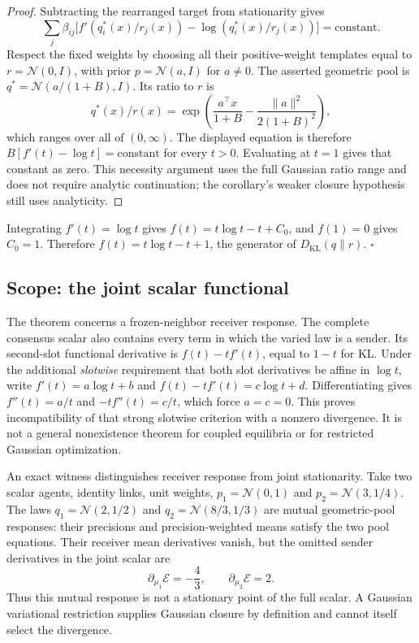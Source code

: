 \begin{proof}
Subtracting the rearranged target from stationarity gives
\begin{equation}
\sum_j\beta_{ij}\big[f'(q_i^*(x)/r_j(x))-\log(q_i^*(x)/r_j(x))\big]=\text{constant}.
\label{eq:summed_stationarity_app}
\end{equation}
Respect the fixed weights by choosing all their positive-weight templates equal to $r=\mathcal N(0,I)$, with prior $p=\mathcal N(a,I)$ for $a\ne0$. The asserted geometric pool is $q^*=\mathcal N(a/(1+B),I)$. Its ratio to $r$ is
\[
q^*(x)/r(x)=\exp\left(\frac{a^\top x}{1+B}-\frac{\|a\|^2}{2(1+B)^2}\right),
\]
which ranges over all of $(0,\infty)$. The displayed equation is therefore $B[f'(t)-\log t]=\text{constant}$ for every $t>0$. Evaluating at $t=1$ gives that constant as zero. This necessity argument uses the full Gaussian ratio range and does not require analytic continuation; the corollary's weaker closure hypothesis still uses analyticity.
\end{proof}

Integrating $f'(t) = \log t$ gives $f(t) = t\log t - t + C_0$, and $f(1)=0$ gives $C_0 = 1$. Therefore $f(t) = t\log t - t + 1$, the generator of $D_{\mathrm{KL}}(q\|r)$. \hfill $\square$

\subsection*{Scope: the joint scalar functional}
The theorem concerns a frozen-neighbor receiver response. The complete consensus scalar also contains every term in which the varied law is a sender. Its second-slot functional derivative is $f(t)-tf'(t)$, equal to $1-t$ for KL. Under the additional \emph{slotwise} requirement that both slot derivatives be affine in $\log t$, write $f'(t)=a\log t+b$ and $f(t)-tf'(t)=c\log t+d$. Differentiating gives $f''(t)=a/t$ and $-tf''(t)=c/t$, which force $a=c=0$. This proves incompatibility of that strong slotwise criterion with a nonzero divergence. It is not a general nonexistence theorem for coupled equilibria or for restricted Gaussian optimization.

An exact witness distinguishes receiver response from joint stationarity. Take two scalar agents, identity links, unit weights, $p_1=\mathcal N(0,1)$ and $p_2=\mathcal N(3,1/4)$. The laws $q_1=\mathcal N(2,1/2)$ and $q_2=\mathcal N(8/3,1/3)$ are mutual geometric-pool responses: their precisions and precision-weighted means satisfy the two pool equations. Their receiver mean derivatives vanish, but the omitted sender derivatives in the joint scalar are
\[
\partial_{\mu_1}\mathcal E=-\frac43,\qquad
\partial_{\mu_2}\mathcal E=2.
\]
Thus this mutual response is not a stationary point of the full scalar. A Gaussian variational restriction supplies Gaussian closure by definition and cannot itself select the divergence.

